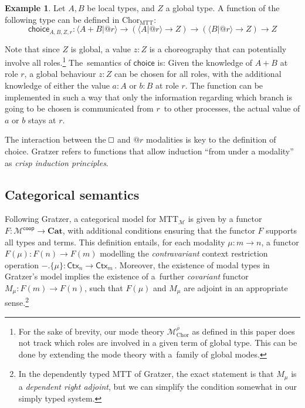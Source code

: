 \documentclass{scrartcl}
\renewcommand{\square}{\mathop{\mathchoice%
  {\tikz{\draw (0,0) rectangle (0.2cm,0.2cm);}}%
  {\tikz{\draw (0,0) rectangle (0.2cm,0.2cm);}}%
  {\tikz{\draw (0,0) rectangle (0.15cm,0.15cm);}}%
  {\tikz{\draw (0,0) rectangle (0.10cm,0.10cm);}}}}
\theoremstyle{definition}
\newtheorem{example}[definition]{Example}
\theoremstyle{plain}
\newcommand{\modetheory}[1]{\mathcal{#1}}
\newcommand{\M}{\modetheory{M}}
\newcommand{\MrhoChor}{\M^\rho_{\textrm{Chor}}}
\newcommand{\MTTM}{MTT${}_{\M}$}
\newcommand{\ChorMTT}{Chor${}_{\textrm{MTT}}$}
\begin{document}
\begin{example}
  Let $A, B$ be local types, and $Z$ a global type. A function of the following
  type can be defined in \ChorMTT:
  \[
    \textsf{choice}_{A,B,Z,r} : \langle A + B | @r \rangle
    \to (\langle A | @r \rangle \to Z)
    \to (\langle B | @r \rangle \to Z)
    \to Z
  \]
\end{example}
Note that since $Z$ is global, a value $z : Z$ is a choreography that can
potentially involve all roles.\footnote{For the sake of brevity, our mode theory
  $\MrhoChor$ as defined in this paper does not track which roles are involved
  in a given term of global type. This can be done by extending the mode theory
  with a~family of global modes.}
The~semantics of $\textsf{choice}$ is: Given the knowledge of $A + B$ at role
$r$, a global behaviour $z : Z$ can be chosen for all roles, with the
additional knowledge of either the value $a : A$ or $b : B$ at role $r$. The
function can be implemented in such a way that only the information regarding
which branch is going to be chosen is communicated from $r$~to other processes,
the actual value of $a$ or $b$ stays at $r$.

The interaction between the $\square$ and $@r$ modalities is key to the
definition of \textsf{choice}. Gratzer refers to functions that allow induction
``from under a modality'' as \emph{crisp induction
principles}\cite[§6.3.1]{gratzer2023syntax}.



\subsection{Categorical semantics}
Following Gratzer, a categorical model for \MTTM{} is given by a functor $F :
\M^{\textsf{coop}} \to \textbf{Cat}$, with additional conditions ensuring that
the functor $F$ supports all types and terms. This definition entails, for each
modality $\mu : m \to n$, a functor $F(\mu) : F(n) \to F(m)$ modelling the
\emph{contravariant} context restriction operation ${-}.\{\mu\} :
\textsf{Ctx}_n \to \textsf{Ctx}_m\,$. Moreover, the existence of modal types in
Gratzer's model implies the existence of a~further \emph{covariant} functor
$M_\mu : F(m) \to F(n)$, such that $F(\mu)$ and $M_\mu$ are adjoint in an
appropriate sense.\footnote{In the dependently typed MTT of Gratzer, the exact
  statement is that $M_\mu$ is a \emph{dependent right adjoint}, but we can
  simplify the condition somewhat in our simply typed system.}
\end{document}
